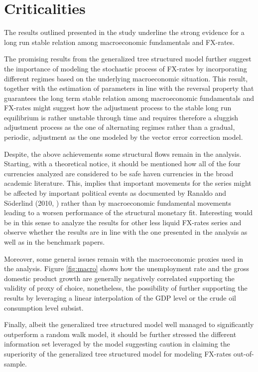 \section{Criticalities}
\label{criticalities}

The results outlined presented in the study underline the strong
evidence for a long run stable relation among macroeconomic
fundamentals and FX-rates.

The promising results from the generalized tree structured model
further suggest the importance of modeling the stochastic process of
FX-rates by incorporating different regimes based on the underlying
macroeconomic situation. This result, together with the estimation of
parameters in line with the reversal property that guarantees the long
term stable relation among macroeconomic fundamentals and FX-rates
might suggest how the adjustment process to the stable long run
equilibrium is rather unstable through time and requires therefore a
sluggish adjustment process as the one of alternating regimes rather
than a gradual, periodic, adjustment as the one modeled by the
vector error correction model.

Despite, the above achievements some structural flows remain in the
analysis. Starting, with a theoretical notice, it should be mentioned
how all of the four currencies analyzed are considered to be safe haven
currencies in the broad academic literature. This, implies that
important movements for the series might be affected by important
political events as documented by Ranaldo and S{\"o}derlind (2010,
\cite{RanaldoSoderlind}) rather than by macroeconomic fundamental
movements leading to a worsen performance of the structural monetary
fit. Interesting would be in this sense to analyze the results for
other less liquid FX-rates series and observe whether the results are
in line with the one presented in the analysis as well as in the
benchmark papers.

Moreover, some general issues remain with the macroeconomic proxies
used in the analysis. Figure \ref{fig:macro} shows how the
unemployment rate and the gross domestic product growth are generally
negatively correlated supporting the validity of proxy of choice,
nonetheless, the possibility of further supporting the results by
leveraging a linear interpolation of the GDP level or the crude oil
consumption level subsist. 

Finally, albeit the generalized tree structured model well managed to
significantly outperform a random walk model, it should be further
stressed the different information set leveraged by the model
suggesting caution in claiming the superiority of the
generalized tree structured model for modeling FX-rates
out-of-sample.